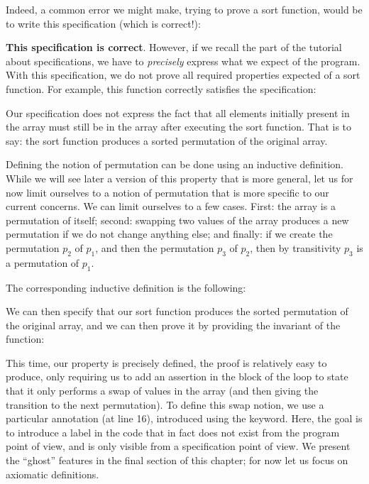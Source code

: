 Indeed, a common error we might make, trying to prove a sort function, would
be to write this specification (which is correct!):




\textbf{This specification is correct}. However, if we recall the part
of the tutorial about specifications, we have to \emph{precisely} express what
we expect of the program. With this specification, we do not prove all required
properties expected of a sort function. For example, this function correctly
satisfies the specification:




Our specification does not express the fact that all elements initially present
in the array must still be in the array after executing the sort function. That
is to say: the sort function produces a sorted permutation of the original
array.

Defining the notion of permutation can be done using an inductive definition.
While we will see later a version of this property that is more general, let us
for now limit ourselves to a notion of permutation that is more specific to our current
concerns. We can limit ourselves to a few cases. First: the array is a permutation of
itself; second: swapping two values of the array produces a new permutation if we
do not change anything else; and finally: if we create the permutation $p_2$ of
$p_1$, and then the permutation $p_3$ of $p_2$, then by transitivity $p_3$ is a
permutation of $p_1$.

The corresponding inductive definition is the following:




We can then specify that our sort function produces the sorted permutation of
the original array, and we can then prove it by providing the invariant of the
function:





This time, our property is precisely defined, the proof is relatively easy to
produce, only requiring us to add an assertion in the block of the loop to state
that it only performs a swap of values in the array (and then giving
the transition to the next permutation). To define this swap notion, we use
a particular annotation (at line 16), introduced using the 
keyword. Here, the goal is to introduce a label in the code that in
fact does not exist from the program point of view, and is only visible from
a specification point of view. We present the ``ghost'' features in the final
section of this chapter; for now let us focus on axiomatic definitions.



